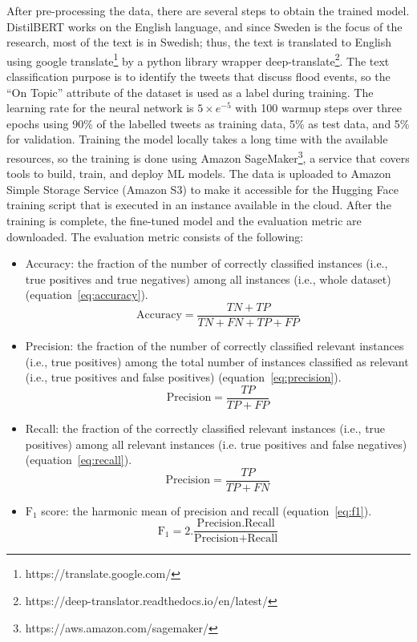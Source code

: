 After pre-processing the data, there are several steps to obtain the trained model. DistilBERT works
on the English language, and since Sweden is the focus of the research, most of the text is in
Swedish; thus, the text is translated to English using google
translate\footnote{https://translate.google.com/} by a python library wrapper
deep-translate\footnote{https://deep-translator.readthedocs.io/en/latest/}. The text classification
purpose is to identify the tweets that discuss flood events, so the ``On Topic'' attribute of the
dataset is used as a label during training. The learning rate for the neural network is $5\times e^{-5}$ with
100 warmup steps over three epochs using 90\% of the labelled tweets as training data, 5\% as test
data, and 5\% for validation. Training the model locally takes a long time with the available
resources, so the training is done using Amazon
SageMaker\footnote{https://aws.amazon.com/sagemaker/}, a service that covers tools to build, train,
and deploy \ac{ML} models. The data is uploaded to Amazon Simple Storage Service (Amazon S3) to make it
accessible for the Hugging Face training script that is executed in an instance available in the
cloud. After the training is complete, the fine-tuned model and the evaluation metric are
downloaded. The evaluation metric consists of the following:

\begin{itemize}
  \item Accuracy: the fraction of the number of correctly classified instances (i.e., true positives
    and true negatives) among all instances (i.e., whole dataset) (equation~\ref{eq:accuracy}).
 \begin{equation}
   \text{Accuracy}=\frac{TN+TP}{TN+FN+TP+FP} 
   \label{eq:accuracy}
\end{equation}
\item Precision: the fraction of the number of correctly classified relevant instances (i.e., true
  positives) among the total number of instances classified as relevant (i.e., true positives and
  false positives) (equation~\ref{eq:precision}).
 \begin{equation}
   \text{Precision}=\frac{TP}{TP+FP} 
   \label{eq:precision}
\end{equation}
\item Recall: the fraction of the correctly classified relevant instances (i.e., true positives)
  among all relevant instances (i.e. true positives and false negatives) (equation~\ref{eq:recall}).
 \begin{equation}
   \text{Precision}=\frac{TP}{TP+FN} 
   \label{eq:recall}
\end{equation}
\item $\text{F}_1$ score: the harmonic mean of precision and recall (equation~\ref{eq:f1}).
 \begin{equation}
   \text{F}_1 =2.\frac{\text{Precision}.\text{Recall}}{\text{Precision}+\text{Recall}} 
   \label{eq:f1}
\end{equation}
\end{itemize}
  

